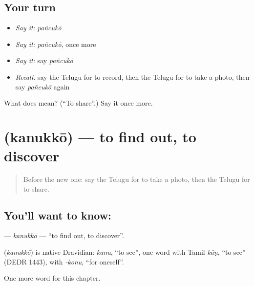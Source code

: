 \subsection*{Your turn}
\begin{itemize}
\raggedright
  \item \emph{Say it:} \emph{pañcukō}
  \item \emph{Say it:} \emph{pañcukō}, once more
  \item \emph{Say it:} say \emph{pañcukō}
  \item \emph{Recall:} say the Telugu for to record, then the Telugu for to take a photo, then say \emph{pañcukō} again
\end{itemize}

\begin{tcolorbox}[breakable,colback=teal!4,colframe=teal!35!black,title={Before you move on}]
What does  mean? (\textquotedblleft{}To share\textquotedblright{}.) Say it once more.
\end{tcolorbox}
\section[\texorpdfstring{\te{కనుక్కో} (kanukkō)}{కనుక్కో (kanukkō)}]{ (kanukkō) — to find out, to discover}

\label{lesson:TE-C205-kanukko}



\begin{quote}
Before the new one: say the Telugu for to take a photo, then the Telugu for to share.
\end{quote}

\subsection*{You'll want to know: }
\textbf{} — \emph{kanukkō} — \textquotedblleft{}to find out, to discover\textquotedblright{}.

\begin{cousinweb}
\textbf{} (\emph{kanukkō}) is native Dravidian: \emph{kanu}, \textquotedblleft{}to see\textquotedblright{}, one word with Tamil \emph{kāṇ}, \textquotedblleft{}to see\textquotedblright{} (DEDR 1443), with \emph{-konu}, \textquotedblleft{}for oneself\textquotedblright{}.
\end{cousinweb}

\begin{grammarlens}[title={What you've built}]
One more word for this chapter.
\end{grammarlens}

